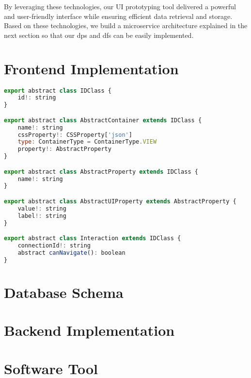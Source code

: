 By leveraging these technologies, our UI prototyping tool delivered a powerful and user-friendly interface while ensuring efficient data retrieval and storage.
Based on these technologies, we build a microservice architecture explained in the next section so that our \ac{dp}s and \ac{df}s can be easily implemented. 
\clearpage


\section{Frontend Implementation}
\label{implementation:section:frontend}

\begin{lstlisting}[language=JavaScript, caption=Abstract classes]
export abstract class IDClass {
    id!: string
}

export abstract class AbstractContainer extends IDClass {
    name!: string
    cssProperty!: CSSProperty['json']
    type: ContainerType = ContainerType.VIEW
    property!: AbstractProperty
}

export abstract class AbstractProperty extends IDClass {
    name!: string
}

export abstract class AbstractUIProperty extends AbstractProperty {
    value!: string
    label!: string
}

export abstract class Interaction extends IDClass {
    connectionId!: string
    abstract canNavigate(): boolean
}
\end{lstlisting}

\section{Database Schema}
\label{implementation:section:database}

\section{Backend Implementation}
\label{implementation:section:backend}

\section{Software Tool}
\label{implementation:section:tool}